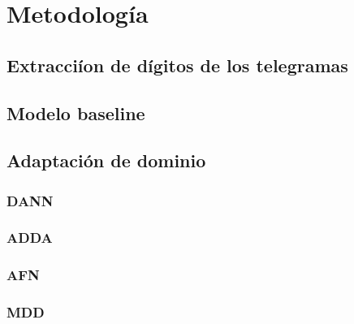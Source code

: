 \chapter{Metodolog\'ia}

\label{Chapter3}

\section{Extracci\'ion de d\'igitos de los telegramas}

\lipsum[1]

\section{Modelo baseline}

\lipsum[1]

\section{Adaptaci\'on de dominio}

\lipsum[1]

\subsection{DANN}

\lipsum[1]

\subsection{ADDA}

\lipsum[1]

\subsection{AFN}

\lipsum[1]

\subsection{MDD}

\lipsum[1]
